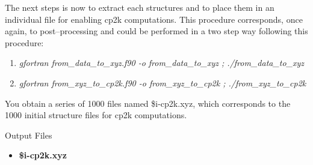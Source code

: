 \documentclass[12pt]{article}
\begin{document}
The next steps is now to extract each structures and to place them in an individual file for enabling cp2k computations. This procedure corresponds, once again, to post--processing and could be performed in a two step way following this procedure:
\begin{enumerate}
    \item \textit{gfortran from\_data\_to\_xyz.f90 -o from\_data\_to\_xyz ; ./from\_data\_to\_xyz}
    \item \textit{gfortran from\_xyz\_to\_cp2k.f90 -o from\_xyz\_to\_cp2k ; ./from\_xyz\_to\_cp2k}
\end{enumerate}
You obtain a series of 1000 files named \$i-cp2k.xyz, which corresponds to the 1000 initial structure files for cp2k computations.
\\
\begin{mybox3}{Output Files}
\begin{itemize}
    \item \textbf{\$i-cp2k.xyz}
\end{itemize}
\end{mybox3}
%
\end{document}
